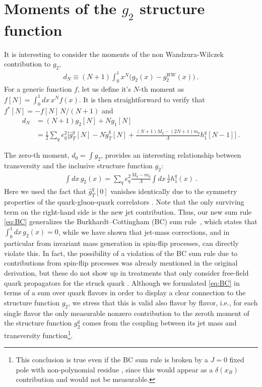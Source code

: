 \documentclass[preprintnumbers,floatfix,nofootinbib]{revtex4}
\newcommand{\xbj}{{x_B}}                   %
\newcommand{\mj}{M_q}
\newcommand{\mq}{m_q}
\begin{document}
\section{Moments of the $g_2$ structure function}
\label{sec:moments}

It is interesting to consider the moments of the non Wandzura-Wilczek contribution to $g_2$,
\begin{align}
  d_N \equiv (N+1) \int_0^1 x^N \bigg( g_2(x) - g_2^{WW}(x) \bigg) \ .
\end{align}
For a generic function $f$, let us define it's $N$-th moment as $f[N]=\int_0^1 dx\, x^{N} f(x)$. It is then straightforward to verify that $f^*[N] = - f[N]\,N/(N+1)$ and  
\begin{align}
  d_N & = (N+1) g_2[N] + N g_1[N] \\
  & = \frac12 \sum_q e_q^2 \bigg[ \hat g_T^q[N] - N \tilde g_T^q[N] 
    + \frac{(N+1) \mj-(2N+1)\mq}{\Lambda} h_1^q[N-1] \bigg] \ .
\end{align}

The zero-th moment, $d_0=\int g_2$, provides an interesting relationship between transversity and the inclusive structure function $g_2$:
\begin{align}
  \label{eq:BC}
  \int dx\, g_2(x) = \sum_q e_q^2 \frac{\mj-\mq}{\Lambda} \int dx\, \frac{1}{x} h_1^q(x) \ .
\end{align}
Here we used the fact that $\widehat g_T^q[0]$ vanishes identically due to the symmetry properties of the quark-gluon-quark correlators \cite{Accardi:2009au}.
%
Note that the only surviving term on the right-hand side is the new jet contribution. Thus, our new sum rule \eqref{eq:BC}
generalizes the Burkhardt--Cottingham (BC) sum rule~\cite{Burkhardt:1970ti},
which states that  $\int_0^1 dx\, g_2(x) =0$, while we have shown that jet-mass corrections, and in particular from invariant mass generation in spin-flip processes,  can directly violate this.
In fact, the possibility of a violation of the BC sum rule due to 
contributions from spin-flip processes was already mentioned in the original
derivation, but these do not show up in treatments that only
consider free-field quark propagators for the struck quark
\cite{Jaffe:1996zw}.  Although we formulated \eqref{eq:BC} in terms of a sum over quark flavors in order to display a clear
connection to the structure function $g_2$, we stress that this is valid also
flavor by flavor, i.e., for each single flavor the only measurable nonzero contribution to the zeroth moment of the
structure function $g_2^q$ comes from the coupling between its jet mass and transversity function\footnote{This conclusion is true even if the BC sum rule is broken by a $J = 0$ fixed pole with
non-polynomial residue \cite{Jaffe:1996zw}, since this would appear as a
$\delta(\xbj)$ contribution and would not be measurable.}.
\end{document}
